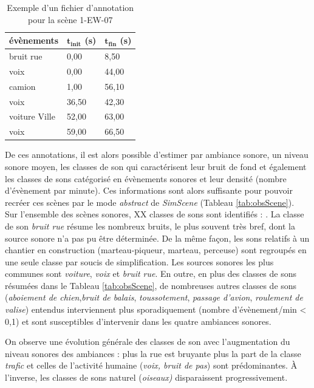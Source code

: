 \begin{table}[t]
\centering
\begin{tabular}{lll}
\textbf{évènements}    & $\mathbf{t_{init}}$ \textbf{(s)} & $\mathbf{t_{fin}}$ \textbf{(s)} \\ \hline
bruit rue     & 0,00            & 8,50           \\ \hline
voix          & 0,00            & 44,00          \\ \hline
camion        & 1,00            & 56,10          \\ \hline
voix          & 36,50           & 42,30          \\ \hline
voiture Ville & 52,00          & 63,00          \\ \hline
voix          & 59,00           & 66,50         
\end{tabular}
\caption{Exemple d'un fichier d'annotation pour la scène 1-EW-07}
\label{tab:exemple_annotation}
\end{table}


De ces annotations, il est alors possible d'estimer par ambiance sonore, un niveau sonore moyen, les classes de son qui caractérisent leur bruit de fond et également les classes de sons catégorisé en évènements sonores et leur densité (nombre d'évènement par minute). Ces informations sont alors suffisante pour pouvoir recréer ces scènes par le mode \textit{abstract} de \textit{SimScene} (Tableau \ref{tab:obsScene}). \\



Sur l'ensemble des scènes sonores, XX classes de sons sont identifiés : . La classe de son \textit{bruit rue} résume les nombreux bruits, le plus souvent très bref, dont la source sonore n'a pas pu être déterminée. De la même façon, les sons relatifs à un chantier en construction (marteau-piqueur, marteau, perceuse) sont regroupés en une seule classe par soucis de simplification. Les sources sonores les plus communes sont \textit{voiture}, \textit{voix} et \textit{bruit rue}. En outre, en plus des classes de sons résumées dans le Tableau \ref{tab:obsScene}, de nombreuses autres classes de sons (\textit{aboiement de chien},\textit{bruit de balais}, \textit{toussotement}, \textit{passage d'avion}, \textit{roulement de valise}) entendus interviennent plus sporadiquement (nombre d'évènement/min < 0,1) et sont susceptibles d'intervenir dans les quatre ambiances sonores.

On observe une évolution générale des classes de son avec l'augmentation du niveau sonores des ambiances : plus la rue est bruyante plus la part de la classe \textit{trafic} et celles de l'activité humaine (\textit{voix, bruit de pas}) sont prédominantes. À l'inverse, les classes de sons \og naturel \fg{} (\textit{oiseaux)} disparaissent progressivement.

